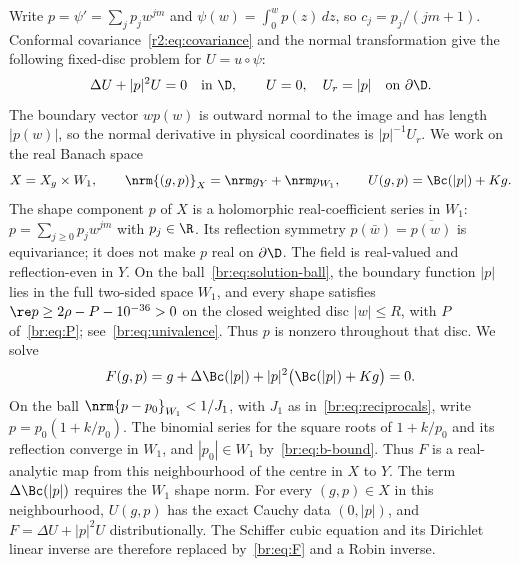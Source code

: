 Write $p=\psi'=\sum_jp_jw^{jm}$ and
$\psi(w)=\int_0^wp(z)\,dz$, so $c_j=p_j/(jm+1)$.
Conformal covariance~\eqref{r2:eq:covariance} and the normal transformation
give the following fixed-disc problem for $U=u\circ\psi$:
\begin{equation}\label{br:eq:pullback}
 \Delta U+|p|^2U=0\quad\text{in }\D,\qquad
 U=0,\quad U_r=|p|\quad\text{on }\partial\D.
\end{equation}
The boundary vector $wp(w)$ is outward normal to the image and has length
$|p(w)|$, so the normal derivative in physical coordinates is
$|p|^{-1}U_r$.
We work on the real Banach space
\begin{equation}\label{br:eq:X}
 X=X_g\times W_1,\qquad
 \nrm{(g,p)}_X=\nrm g_Y+\nrm p_{W_1},\qquad
 U(g,p)=\Bc(|p|)+Kg.
\end{equation}
The shape component $p$ of $X$ is a holomorphic real-coefficient series
in $W_1$: $p=\sum_{j\ge0}p_jw^{jm}$ with $p_j\in\R$. Its reflection
symmetry $p(\bar w)=\overline{p(w)}$ is equivariance; it does not make
$p$ real on $\partial\D$. The field is real-valued and reflection-even
in $Y$. On the ball~\eqref{br:eq:solution-ball}, the boundary function
$|p|$ lies in the full two-sided space $W_1$, and every shape satisfies
$\re p\ge2\rho-P-\brRadius>0$ on the closed weighted disc $|w|\le R$,
with $P$ of~\eqref{br:eq:P}; see~\eqref{br:eq:univalence}. Thus $p$ is
nonzero throughout that disc.
We solve
\begin{equation}\label{br:eq:F}
 F(g,p)=g+\Delta\Bc(|p|)+|p|^2\bigl(\Bc(|p|)+Kg\bigr)=0.
\end{equation}
On the ball $\nrm{p-p_0}_{W_1}<1/J_1$, with $J_1$ as
in~\eqref{br:eq:reciprocals}, write $p=p_0(1+k/p_0)$. The binomial
series for the square roots of $1+k/p_0$ and its reflection converge
in $W_1$, and $|p_0|\in W_1$ by~\eqref{br:eq:b-bound}. Thus $F$
is a real-analytic map from this neighbourhood of the centre in $X$ to $Y$.
The term $\Delta\Bc(|p|)$ requires the $W_1$ shape norm.
For every $(g,p)\in X$ in this neighbourhood, $U(g,p)$ has the exact
Cauchy data $(0,|p|)$, and $F=\Delta U+|p|^2U$ distributionally.
The Schiffer cubic equation and its Dirichlet linear inverse are therefore
replaced by~\eqref{br:eq:F} and a Robin inverse.

